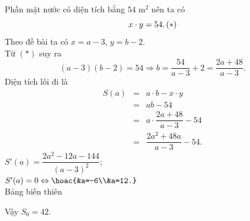 \begin{bt}
{		Phần mặt nước có diện tích bằng $54$ m$^2$ nên ta có $$x\cdot y=54.\, \hfill(*)$$
		Theo đề bài ta có $x=a-3$, $y=b-2$.\\
		Từ $(*)$ suy ra $$(a-3)(b-2)=54\Rightarrow b=\dfrac{54}{a-3}+2=\dfrac{2a+48}{a-3}.$$
		Diện tích lối đi là \begin{eqnarray*}
			S(a)&=&a\cdot b-x\cdot y\\
			&=&ab-54\\
			&=&a\cdot \dfrac{2a+48}{a-3}-54\\
			&=&\dfrac{2a^2+48a}{a-3}-54.
		\end{eqnarray*}
		$S'(a)=\dfrac{2a^2-12a-144}{\left(a-3\right)^2}$;\\
		$S'(a)=0\Leftrightarrow \hoac{&a=-6\\&a=12.}$\\
		Bảng biến thiên
		\begin{center}
		\end{center}
		Vậy $S_0=42$.
	}
\end{bt}

